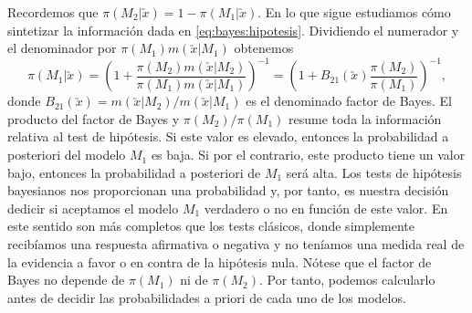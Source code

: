 Recordemos que $\pi(M_2 | \utilde{x}) = 1 - \pi(M_1 | \utilde{x})$. En lo que sigue estudiamos cómo sintetizar la información dada en \eqref{eq:bayes:hipotesis}. Dividiendo el numerador y el denominador por $\pi(M_1) m(\utilde{x} | M_1)$ obtenemos
\begin{equation} \label{eq:bayes:hipotesis:2}
\pi(M_1 | \utilde{x}) =  \left(1 + \frac{\pi(M_2) m(\utilde{x} | M_2)}{\pi(M_1) m(\utilde{x} | M_1)}\right)^{-1} = \left(1 + B_{21}(\utilde{x})\frac{\pi(M_2) }{\pi(M_1)}\right)^{-1},
\end{equation}
donde $B_{21}(\utilde{x}) = m(\utilde{x}| M_2) / m(\utilde{x}| M_1)$ es el denominado factor de Bayes. El producto del factor de Bayes y $\pi(M_2) / \pi(M_1)$ resume toda la información relativa al test de hipótesis. Si este valor es elevado, entonces la probabilidad a posteriori del modelo $M_1$ es baja. Si por el contrario, este producto tiene un valor bajo, entonces la probabilidad a posteriori de $M_1$ será alta. Los tests de hipótesis bayesianos nos proporcionan una probabilidad y, por tanto, es nuestra decisión dedicir si aceptamos el modelo $M_1$ verdadero o no en función de este valor. En este sentido son más completos que los tests clásicos, donde simplemente recibíamos una respuesta afirmativa o negativa y no teníamos una medida real de la evidencia a favor o en contra de la hipótesis nula. Nótese que el factor de Bayes no depende de $\pi(M_1)$ ni de $\pi(M_2)$. Por tanto, podemos calcularlo antes de decidir las probabilidades a priori de cada uno de los modelos.


